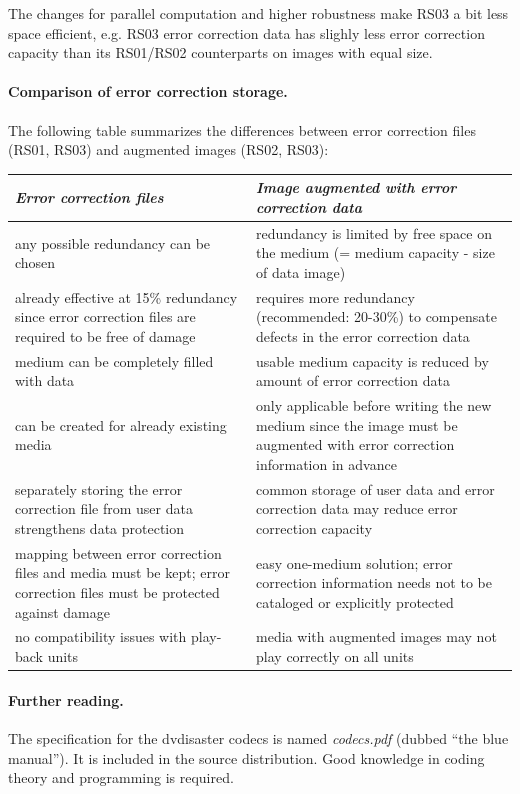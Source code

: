 The changes for parallel computation and higher robustness make RS03 a bit less space efficient, 
e.g. RS03 error correction data has slighly less error correction capacity than 
its RS01/RS02 counterparts on images with equal size.

\newpage

\paragraph{Comparison of error correction storage.} The following table summarizes the differences 
between error correction files (RS01, RS03) and augmented images (RS02, RS03):

\smallskip

\begin{tabular}{|p{}|p{}|}
\hline
{\em Error correction files} 	& 
{\em Image augmented with error correction data} \\
\hline
any possible redundancy can be chosen &	
redundancy is limited by free space on the medium (= medium capacity - size of data image) \\
\hline
already effective at 15\% redundancy since error correction files are required to be free of damage &
requires more redundancy (recommended: 20-30\%) to compensate defects in the error correction data \\
\hline
medium can be completely filled with data  &
usable medium capacity is reduced by amount of error correction data \\
\hline
can be created for already existing media & 
only applicable before writing the new medium since the image must be augmented with error correction information in advance \\
\hline
separately storing the error correction file from user data strengthens data protection &
common storage of user data and error correction data may reduce error correction capacity \\
\hline
mapping between error correction files and media must be kept; error correction files must be 
protected against damage &
easy one-medium solution; error correction information needs not to be cataloged or explicitly protected \\
\hline
no compatibility issues with play-back units &
media with augmented images may not play correctly on all units \\
\hline
\end{tabular}

\paragraph{Further reading.} The specification for the dvdisaster codecs 
is named {\it codecs.pdf} (dubbed ``the blue manual''). It is included in the source distribution. Good knowledge in coding theory and programming is required.

